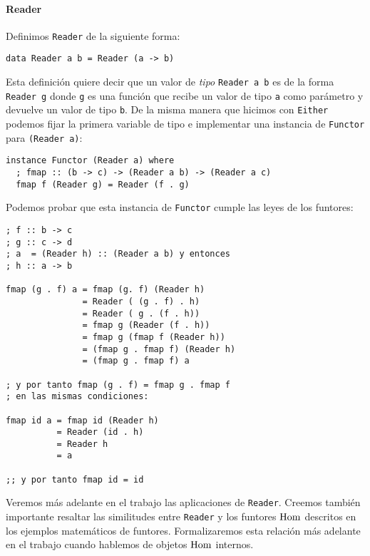 \paragraph{Reader}
Definimos \texttt{Reader} de la siguiente forma:
\begin{verbatim}
data Reader a b = Reader (a -> b)
\end{verbatim}

Esta definición quiere decir
que un valor de \textit{tipo} \texttt{Reader a b} es
de la forma \texttt{Reader g} donde \texttt{g} es
una función que recibe un valor de tipo \texttt{a} como
parámetro y devuelve un valor de tipo \texttt{b}. De la misma manera
que hicimos con \texttt{Either} podemos fijar la primera variable
de tipo e implementar una instancia de \texttt{Functor} para
\texttt{(Reader a)}:

\begin{verbatim}
instance Functor (Reader a) where
  ; fmap :: (b -> c) -> (Reader a b) -> (Reader a c)
  fmap f (Reader g) = Reader (f . g)
\end{verbatim}

Podemos probar que esta instancia de \texttt{Functor} cumple
las leyes de los funtores:

\begin{verbatim}
; f :: b -> c
; g :: c -> d
; a  = (Reader h) :: (Reader a b) y entonces
; h :: a -> b

fmap (g . f) a = fmap (g. f) (Reader h)
               = Reader ( (g . f) . h)
               = Reader ( g . (f . h))
               = fmap g (Reader (f . h))
               = fmap g (fmap f (Reader h))
               = (fmap g . fmap f) (Reader h)
               = (fmap g . fmap f) a

; y por tanto fmap (g . f) = fmap g . fmap f
; en las mismas condiciones:

fmap id a = fmap id (Reader h)
          = Reader (id . h)
          = Reader h
          = a

;; y por tanto fmap id = id
\end{verbatim}

Veremos más adelante en el trabajo las aplicaciones
de \texttt{Reader}. Creemos también importante resaltar las similitudes
entre \texttt{Reader} y los funtores $\operatorname{Hom}$ descritos en los ejemplos
matemáticos de funtores. Formalizaremos esta relación
más adelante en el trabajo
cuando hablemos de objetos $\operatorname{Hom}$ internos.
